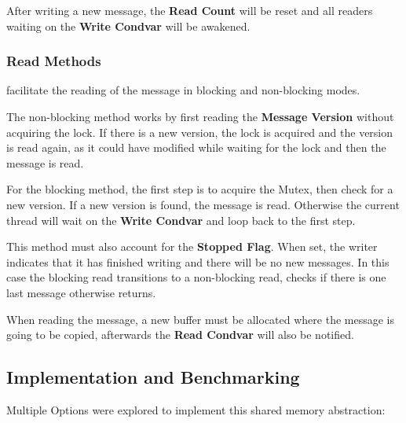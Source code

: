 \documentclass[conference]{IEEEtran}
\begin{document}
After writing a new message, the \textbf{Read Count} will be reset and all readers waiting on the \textbf{Write Condvar} will be awakened.

\subsubsection{\textbf{Read Methods}}
facilitate the reading of the message in blocking and non-blocking modes.

The non-blocking method works by first reading the \textbf{Message Version} without acquiring the lock.
If there is a new version, the lock is acquired and the version is read again, as it could have modified while waiting for the lock and then the message is read.

For the blocking method, the first step is to acquire the Mutex, then check for a new version.
If a new version is found, the message is read.
Otherwise the current thread will wait on the \textbf{Write Condvar} and loop back to the first step.

This method must also account for the \textbf{Stopped Flag}.
When set, the writer indicates that it has finished writing and there will be no new messages.
In this case the blocking read transitions to a non-blocking read, checks if there is one last message otherwise returns.

When reading the message, a new buffer must be allocated where the message is going to be copied, afterwards the \textbf{Read Condvar} will also be notified.

\subsection{Implementation and Benchmarking}

Multiple Options were explored to implement this shared memory abstraction:
\end{document}
